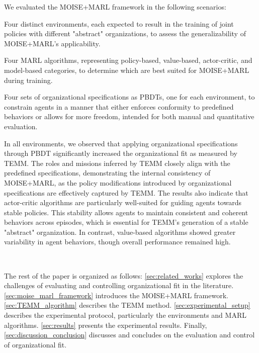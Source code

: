 \documentclass[sigconf,anonymous]{aamas}
\begin{document}
We evaluated the MOISE+MARL framework in the following scenarios:
\begin{enumerate*}[label={\roman*) },itemjoin={; \quad}]
  \item Four distinct environments, each expected to result in the training of joint policies with different "abstract" organizations, to assess the generalizability of MOISE+MARL's applicability.
  \item Four MARL algorithms, representing policy-based, value-based, actor-critic, and model-based categories, to determine which are best suited for MOISE+MARL during training.
  \item Four sets of organizational specifications as PBDTs, one for each environment, to constrain agents in a manner that either enforces conformity to predefined behaviors or allows for more freedom, intended for both manual and quantitative evaluation.
\end{enumerate*}

In all environments, we observed that applying organizational specifications through PBDT significantly increased the organizational fit as measured by TEMM. The roles and missions inferred by TEMM closely align with the predefined specifications, demonstrating the internal consistency of MOISE+MARL, as the policy modifications introduced by organizational specifications are effectively captured by TEMM.
The results also indicate that actor-critic algorithms are particularly well-suited for guiding agents towards stable policies. This stability allows agents to maintain consistent and coherent behaviors across episodes, which is essential for TEMM's generation of a stable "abstract" organization. In contrast, value-based algorithms showed greater variability in agent behaviors, though overall performance remained high.

\

The rest of the paper is organized as follows: \autoref{sec:related_works} explores the challenges of evaluating and controlling organizational fit in the literature. \autoref{sec:moise_marl_framework} introduces the MOISE+MARL framework. \autoref{sec:TEMM_algorithm} describes the TEMM method. \autoref{sec:experimental_setup} describes the experimental protocol, particularly the environments and MARL algorithms. \autoref{sec:results} presents the experimental results. Finally, \autoref{sec:discussion_conclusion} discusses and concludes on the evaluation and control of organizational fit.
\end{document}
